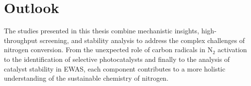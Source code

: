 \section{Outlook}

The studies presented in this thesis combine mechanistic insights, high-throughput screening, and stability analysis to address the complex challenges of nitrogen conversion. From the unexpected role of carbon radicals in N$_2$ activation to the identification of selective photocatalysts and finally to the analysis of catalyst stability in EWAS, each component contributes to a more holistic understanding of the sustainable chemistry of nitrogen.


